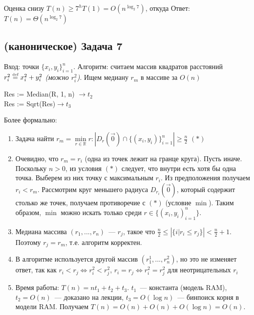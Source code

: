 \documentclass[a4paper]{article}
\def\eqdef{\overset{\mbox{\tiny def}}{=}}
\begin{document}
Оценка снизу $T(n)\geqslant 7^hT(1)=O(n^{\log_2 7})$, откуда\newline
Ответ: $\boxed{T(n)=\Theta(n^{\log_2 7})}$
\subsection*{(каноническое) Задача 7}
Вход: точки $\{x_i,y_i\}_{i=1}^n$.\newline
Алгоритм: считаем массив квадратов расстояний $r_i^2\eqdef x_i^2+y_i^2$ {\em (можно $r_i^2$)}. Ищем медиану $r_m$ в массиве за $O(n)$\newline
\	\begin{algorithm}[H]
	 \SetAlgoLined
	Res := Median(R, 1, n) $\rightarrow t_2$\\
	Res := Sqrt(Res)$\rightarrow t_3$\\
	\end{algorithm}
Более формально:
\begin{enumerate}
\item Задача найти $r_m=\min\limits_{r\in\mathbb{R}} r\colon |D_r(\vec{0})\cap\{(x_i,y_i)\}_{i=1}^n|\geqslant\frac{n}{2}$ $(*)$
\item Очевидно, что $r_m=r_i$ (одна из точек лежит на гранце круга).\newline
Пусть иначе. Поскольку $n>0$, из условия $(*)$ следует, что внутри есть хотя бы одна точка. Выберем из них точку с максимальным $r_i$. Из предположения получаем $r_i<r_m$. Рассмотрим круг меньшего радиуса $D_{r_i}(\vec{0})$, который содержит столько же точек, получаем противоречие с $(*)$ (условие $\min$).\newline
Таким образом, $\min$ можно искать только среди $r\in\{(x_i,y_i)_{i=1}^n\}$.
\item Медиана массива $(r_1,...,r_n)$~--- $r_j$, такое что $\frac{n}{2}\leqslant|\{i\big|r_i\leqslant r_j\}|<\frac{n}{2}+1$. Поэтому $r_j=r_m$, т.е. алгоритм корректен.
\item В алгоритме используется другой массив $(r_1^1,...,r_n^2)$, но это не изменяет ответ, так как $r_i<r_j\Leftrightarrow r_i^2<r_j^2$, $r_i=r_j\Leftrightarrow r_i^2=r_j^2$ для неотрицательных $r_i$
\item Время работы: $T(n)=nt_1+t_2+t_3$. $t_1$~--- константа (модель RAM), $t_2=O(n)$~--- доказано на лекции, $t_3=O(\log n)$~--- бинпоиск корня в модели RAM. Получаем $T(n)=O(n)+O(n)+O(\log n)=O(n)$.
\end{enumerate}
\end{document}
